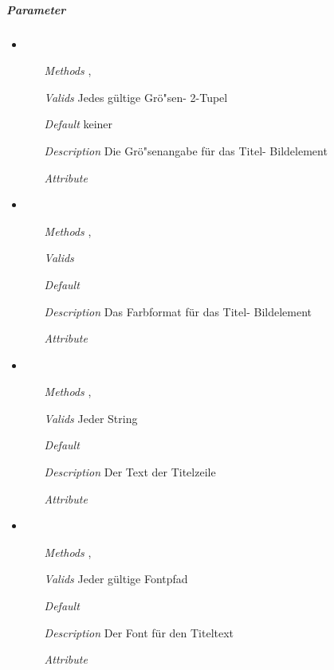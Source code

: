 \subparagraph{Parameter}
\begin{itemize}

\item {}
\begin{enumerate}
\item[\textit{Methods}]
, 
\item[\textit{Valids}] Jedes g\"ultige Gr\"o"sen- 2-Tupel
\item[\textit{Default}] keiner
\item[\textit{Description}] Die Gr\"o"senangabe
f\"ur das Titel- Bildelement
\item[\textit{Attribute}] 
\end{enumerate}

\item {}
\begin{enumerate}
\item[\textit{Methods}] 
,
\item[\textit{Valids}] 
\item[\textit{Default}] 
\item[\textit{Description}] Das Farbformat f\"ur das
Titel- Bildelement
\item[\textit{Attribute}] 
\end{enumerate}

\item {}
\begin{enumerate}
\item[\textit{Methods}] ,
\item[\textit{Valids}] Jeder String
\item[\textit{Default}] 
\item[\textit{Description}] Der Text der Titelzeile
\item[\textit{Attribute}] 
\end{enumerate}

\item {}
\begin{enumerate}
\item[\textit{Methods}] 
,
\item[\textit{Valids}] Jeder g\"ultige Fontpfad
\item[\textit{Default}] 
\item[\textit{Description}] Der Font f\"ur den Titeltext
\item[\textit{Attribute}] 
\end{enumerate}


\end{itemize}
